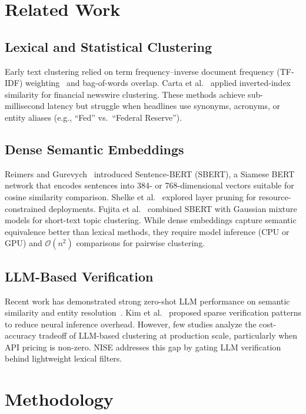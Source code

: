 \documentclass[conference]{IEEEtran}
\begin{document}
\section{Related Work}

\subsection{Lexical and Statistical Clustering}
Early text clustering relied on term frequency--inverse document frequency (TF-IDF) weighting~\cite{salton1988} and bag-of-words overlap.
Carta et al.~\cite{carta2022} applied inverted-index similarity for financial newswire clustering.
These methods achieve sub-millisecond latency but struggle when headlines use synonyms, acronyms, or entity aliases (e.g., ``Fed'' vs.\ ``Federal Reserve'').

\subsection{Dense Semantic Embeddings}
Reimers and Gurevych~\cite{reimers2019sentence} introduced Sentence-BERT (SBERT), a Siamese BERT network that encodes sentences into 384- or 768-dimensional vectors suitable for cosine similarity comparison.
Shelke et al.~\cite{shelke2022} explored layer pruning for resource-constrained deployments.
Fujita et al.~\cite{fujita2023} combined SBERT with Gaussian mixture models for short-text topic clustering.
While dense embeddings capture semantic equivalence better than lexical methods, they require model inference (CPU or GPU) and $\mathcal{O}(n^2)$ comparisons for pairwise clustering.

\subsection{LLM-Based Verification}
Recent work has demonstrated strong zero-shot LLM performance on semantic similarity and entity resolution~\cite{tarekegn2023,jin2023}.
Kim et al.~\cite{kim2022} proposed sparse verification patterns to reduce neural inference overhead.
However, few studies analyze the cost-accuracy tradeoff of LLM-based clustering at production scale, particularly when API pricing is non-zero.
NISE addresses this gap by gating LLM verification behind lightweight lexical filters.

\section{Methodology}
\end{document}

